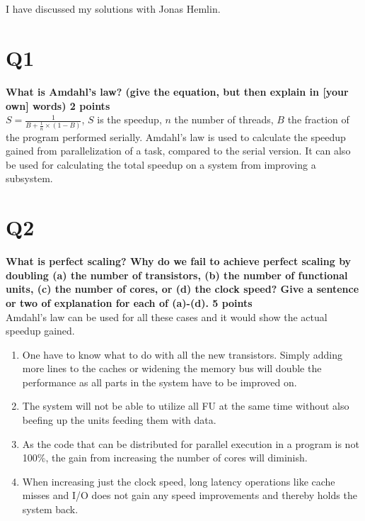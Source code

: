 \documentclass[a4paper]{article}
\begin{document}
\section*{}
I have discussed my solutions with Jonas Hemlin.

\section*{Q1}
\large{\textbf{What is Amdahl’s law? (give the equation, but then explain in [your own] words) 2 points\\}}
$S=\frac{1}{B + \frac{1}{n}\times(1-B)}$, $S$ is the speedup, $n$ the number of threads, $B$ the fraction of the program performed serially. Amdahl’s law is used to calculate the speedup gained from parallelization of a task, compared to the serial version. It can also be used for calculating the total speedup on a system from improving a subsystem.

\section*{Q2}
\large{\textbf{What is perfect scaling? Why do we fail to achieve perfect scaling by doubling (a) the number of transistors, (b) the number of functional units, (c) the number of cores, or (d) the clock speed? Give a sentence or two of explanation for each of (a)-(d). 5 points\\}}
Amdahl's law can be used for all these cases and it would show the actual speedup gained.
\begin{enumerate}
\item
One have to know what to do with all the new transistors. Simply adding more lines to the caches or widening the memory bus will double the performance as all parts in the system have to be improved on. 
\item
The system will not be able to utilize all FU at the same time without also beefing up the units feeding them with data. 
\item
As the code that can be distributed for parallel execution in a program is not 100\%, the gain from increasing the number of cores will diminish.  
\item
When increasing just the clock speed, long latency operations like cache misses and I/O does not gain any speed improvements and thereby holds the system back.
\end{enumerate}
\end{document}
